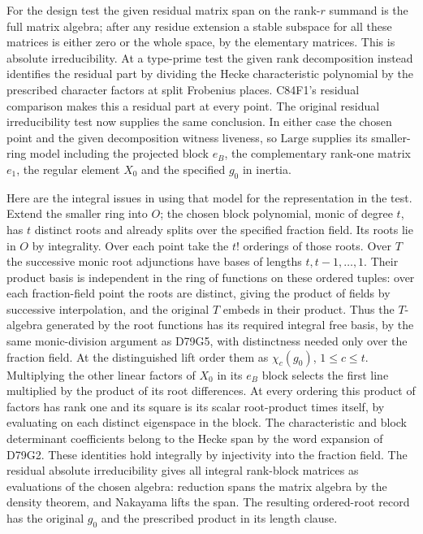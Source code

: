 For the design test the given residual matrix span on the
rank-$r$ summand is the full matrix algebra; after any residue
extension a stable subspace for all these matrices is either
zero or the whole space, by the elementary matrices. This is
absolute irreducibility. At a type-prime test the given rank
decomposition instead identifies the residual part by dividing
the Hecke characteristic polynomial by the prescribed character
factors at split Frobenius places. C84F1's residual comparison
makes this a residual part at every point. The original
residual irreducibility test now supplies the same conclusion.
In either case the chosen point and the given decomposition
witness liveness, so $\mathrm{Large}$ supplies its smaller-ring
model including the projected block $e_B$, the complementary
rank-one matrix $e_1$, the regular element $X_0$ and the
specified $g_0$ in inertia.

Here are the integral issues in using that model for the
representation in the test. Extend the smaller ring into $O$;
the chosen block polynomial, monic of degree $t$, has $t$
distinct roots and already splits over the specified fraction
field. Its roots lie in $O$ by integrality. Over each point take
the $t!$ orderings of those roots. Over $T$ the successive monic
root adjunctions have bases of lengths $t,t-1,\ldots,1$.
Their product basis is independent in the ring of functions on
these ordered tuples: over each fraction-field point the roots
are distinct, giving the product of fields by successive
interpolation, and the original $T$ embeds in their product.
Thus the $T$-algebra generated by the root functions has its
required integral free basis, by the same monic-division argument
as D79G5, with distinctness needed only over the fraction field. At the distinguished lift order
them as $\chi_c(g_0)$, $1\le c\le t$. Multiplying the other
linear factors of $X_0$ in its $e_B$ block selects the first
line multiplied by the product of its root differences.
At every ordering this product of factors has rank one and its
square is its scalar root-product times itself, by evaluating on
each distinct eigenspace in the block. The characteristic and
block determinant coefficients belong to the Hecke span by the
word expansion of D79G2. These identities hold integrally by
injectivity into the fraction field. The residual
absolute irreducibility gives all integral rank-block matrices
as evaluations of the chosen algebra: reduction spans the
matrix algebra by the density theorem, and Nakayama lifts the
span. The resulting ordered-root record has the original
$g_0$ and the prescribed product in its length clause.


